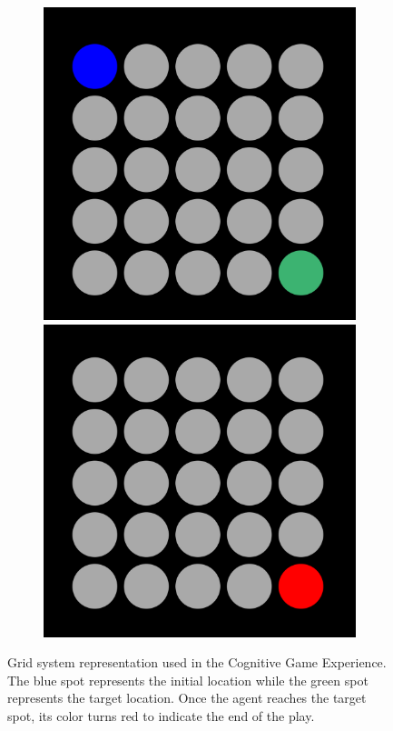 \documentclass[journal]{IEEEtran}
\begin{document}
{\begin{figure}[h!]
\begin{subfigure}{0.5\textwidth}
\centering 
\includegraphics[scale=0.2]{Images/grid_initial_state.png}
\includegraphics[scale=0.2]{Images/grid_end_state.png}
\end{subfigure}
\centering 
\caption{Grid system representation used in the Cognitive Game Experience. The blue spot represents the initial location while the green spot represents the target location. Once the agent reaches the target spot, its color turns red to indicate the end of the play.}
\label{fig:game_representation}
\end{figure}

}
\end{document}
